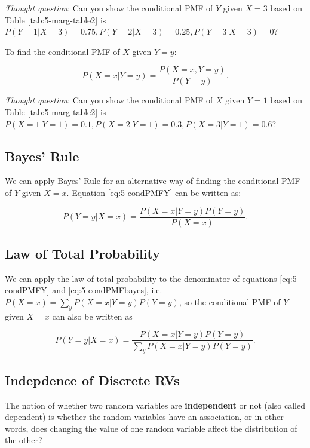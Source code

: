 \documentclass[
]{book}
\begin{document}
\emph{Thought question}: Can you show the conditional PMF of \(Y\) given \(X=3\) based on Table \ref{tab:5-marg-table2} is \(P(Y=1|X=3) = 0.75, P(Y=2|X=3) = 0.25, P(Y=3|X=3) = 0\)?

To find the conditional PMF of \(X\) given \(Y=y\):

\begin{equation} 
P(X=x|Y=y) = \frac{P(X=x, Y=y)}{P(Y=y)}.
\label{eq:5-condPMFX}
\end{equation}

\emph{Thought question}: Can you show the conditional PMF of \(X\) given \(Y=1\) based on Table \ref{tab:5-marg-table2} is \(P(X=1|Y=1) = 0.1, P(X=2|Y=1) = 0.3, P(X=3|Y=1) = 0.6\)?

\subsection{Bayes' Rule}\label{bayes-rule-1}

We can apply Bayes' Rule for an alternative way of finding the conditional PMF of \(Y\) given \(X=x\). Equation \eqref{eq:5-condPMFY} can be written as:

\begin{equation} 
P(Y=y|X=x) = \frac{P(X=x|Y=y) P(Y=y)}{P(X=x)}.
\label{eq:5-condPMFbayes}
\end{equation}

\subsection{Law of Total Probability}\label{law-of-total-probability-1}

We can apply the law of total probability to the denominator of equations \eqref{eq:5-condPMFY} and \eqref{eq:5-condPMFbayes}, i.e.~\(P(X=x) = \sum_y P(X=x|Y=y) P(Y=y)\), so the conditional PMF of \(Y\) given \(X=x\) can also be written as

\begin{equation} 
P(Y=y|X=x) = \frac{P(X=x|Y=y) P(Y=y)}{\sum_y P(X=x|Y=y) P(Y=y)}.
\label{eq:5-condPMFtotal}
\end{equation}

\subsection{Indepdence of Discrete RVs}\label{indepdence-of-discrete-rvs}

The notion of whether two random variables are \textbf{independent} or not (also called dependent) is whether the random variables have an association, or in other words, does changing the value of one random variable affect the distribution of the other?
\end{document}
